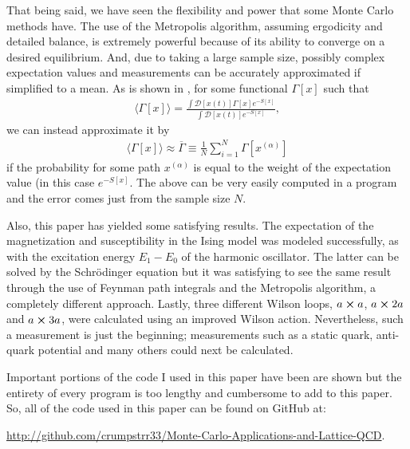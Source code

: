 \documentclass[11pt]{article}
\begin{document}
That being said, we have seen the flexibility and power that some Monte Carlo methods have. The use of the Metropolis algorithm, assuming ergodicity and detailed balance, is extremely powerful because of its ability to converge on a desired equilibrium. And, due to taking a large sample size, possibly complex expectation values and measurements can be accurately approximated if simplified to a mean. As is shown in \cite{MainPaper}, for some functional $\Gamma[x]$ such that
\begin{align}
	\langle\Gamma[x]\rangle=\frac{\int\mathcal{D}[x(t)]\Gamma[x]e^{-S[x]}}{\int\mathcal{D}[x(t)]e^{-S[x]}},
\end{align}
we can instead approximate it by
\begin{align}
	\langle\Gamma[x]\rangle\approx\overline{\Gamma}\equiv\frac{1}{N}\sum_{i=1}^N\Gamma[x^{(\alpha)}]
\end{align}
if the probability for some path $x^{(\alpha)}$ is equal to the weight of the expectation value (in this case $e^{-S[x]}$. The above can be very easily computed in a program and the error comes just from the sample size $N$.

Also, this paper has yielded some satisfying results. The expectation of the magnetization and susceptibility in the Ising model was modeled successfully, as with the excitation energy $E_1-E_0$ of the harmonic oscillator. The latter can be solved by the Schr\"odinger equation but it was satisfying to see the same result through the use of Feynman path integrals and the Metropolis algorithm, a completely different approach. Lastly, three different Wilson loops, $a\cross a$, $a\cross2a$ and $a\cross3a$, were calculated using an improved Wilson action. Nevertheless, such a measurement is just the beginning; measurements such as a static quark, anti-quark potential and many others could next be calculated.

Important portions of the code I used in this paper have been are shown but the entirety of every program is too lengthy and cumbersome to add to this paper. So, all of the code used in this paper can be found on GitHub at:

\url{http://github.com/crumpstrr33/Monte-Carlo-Applications-and-Lattice-QCD}.

\break


\end{document}
